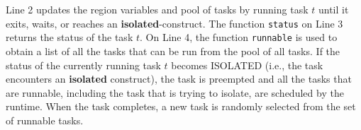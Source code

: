 Line 2 updates the region variables and pool of tasks by running task $t$ until it exits, waits, or reaches an \textbf{isolated}-construct. The function \texttt{status} on Line 3 returns the status of the task $t$. On Line 4, the function \texttt{runnable} is used to obtain a list of all the tasks that can be run from the pool of all tasks. If the status of the currently running task $t$ becomes ISOLATED (i.e., the task encounters an \textbf{isolated} construct), the task is preempted and all the tasks that are runnable, including the task that is trying to isolate, are scheduled by the runtime. When the task completes, a new task is randomly selected from the set of runnable tasks.

